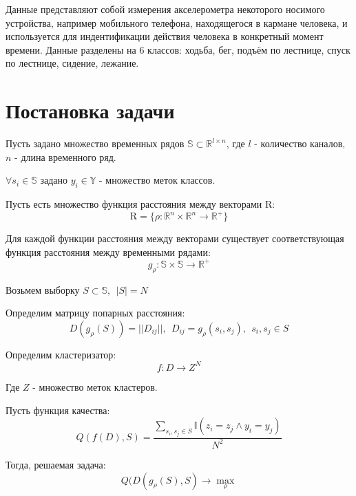 \documentclass[12pt,twoside]{article}
\begin{document}
				Данные представляют собой измерения акселерометра некоторого носимого устройства, например мобильного телефона, находящегося в кармане человека, и используется для индентификации действия человека в конкретный момент времени. Данные разделены на 6 классов: ходьба, бег, подъём по лестнице, спуск по лестнице, сидение, лежание.
				
    \section{Постановка задачи}
        
        Пусть задано множество временных рядов $\mathbb{S} \subset \mathbb{R}^{l \times n}$,
        где $l$ \-- количество каналов, $n$ \-- длина временного ряд.

        $\forall s_i \in \mathbb{S}$ задано ${y_i \in \mathbb{Y}}$ \-- множество меток классов.

        Пусть есть множество функция расстояния между векторами $\mathrm{R}$:
        $$
            \mathrm{R} = \{\rho: \mathbb{R}^n \times \mathbb{R}^n \rightarrow \mathbb{R}^+ \}
        $$

        Для каждой функции расстояния между векторами существует соответствующая функция расстояния между временными рядами:
        $$
            g_{\rho}: \mathbb{S} \times \mathbb{S} \rightarrow \mathbb{R}^+ 
        $$

        Возьмем выборку $ S \subset \mathbb{S}, \ \ |S| = N$

        Определим матрицу попарных расстояния:
        $$
            D(g_\rho(S)) = ||D_{ij}||, \ \ D_{ij} = g_\rho(s_i, s_j),\ \ s_i, s_j \in S 
        $$
        
        Определим кластеризатор:
        $$
            f: D \rightarrow Z^N
        $$

        Где $Z$ \-- множество меток кластеров.

        Пусть функция качества:
        $$
            Q(f(D), S) = \frac{\sum_{s_i, s_j \in S} \mathbb{I}(z_i = z_j \land  y_i = y_j)}{N^2}
        $$

        Тогда, решаемая задача:
        $$
            Q(D(g_\rho(S), S) \rightarrow \max_{\rho}
        $$

				
\end{document}

